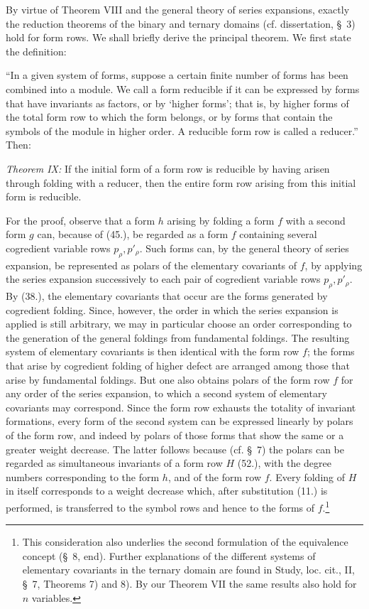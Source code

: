 \documentclass[11pt]{article}
\begin{document}
By virtue of Theorem VIII and the general theory of series expansions, exactly the reduction theorems of the binary and ternary domains (cf. dissertation, \S\ 3) hold for form rows. We shall briefly derive the principal theorem. We first state the definition:

``In a given system of forms, suppose a certain finite number of forms has been combined into a module. We call a form reducible if it can be expressed by forms that have invariants as factors, or by `higher forms'; that is, by higher forms of the total form row to which the form belongs, or by forms that contain the symbols of the module in higher order. A reducible form row is called a reducer.'' Then:

\emph{Theorem IX:} If the initial form of a form row is reducible by having arisen through folding with a reducer, then the entire form row arising from this initial form is reducible.

For the proof, observe that a form $h$ arising by folding a form $f$ with a second form $g$ can, because of (45.), be regarded as a form $f$ containing several cogredient variable rows $p_\rho,p'_\rho$. Such forms can, by the general theory of series expansion, be represented as polars of the elementary covariants of $f$, by applying the series expansion successively to each pair of cogredient variable rows $p_\rho,p'_\rho$. By (38.), the elementary covariants that occur are the forms generated by cogredient folding. Since, however, the order in which the series expansion is applied is still arbitrary, we may in particular choose an order corresponding to the generation of the general foldings from fundamental foldings. The resulting system of elementary covariants is then identical with the form row $f$; the forms that arise by cogredient folding of higher defect are arranged among those that arise by fundamental foldings. But one also obtains polars of the form row $f$ for any order of the series expansion, to which a second system of elementary covariants may correspond. Since the form row exhausts the totality of invariant formations, every form of the second system can be expressed linearly by polars of the form row, and indeed by polars of those forms that show the same or a greater weight decrease. The latter follows because (cf. \S\ 7) the polars can be regarded as simultaneous invariants of a form row $H$ (52.), with the degree numbers corresponding to the form $h$, and of the form row $f$. Every folding of $H$ in itself corresponds to a weight decrease which, after substitution (11.) is performed, is transferred to the symbol rows and hence to the forms of $f$.\footnote{This consideration also underlies the second formulation of the equivalence concept (\S\ 8, end). Further explanations of the different systems of elementary covariants in the ternary domain are found in Study, loc. cit., II, \S\ 7, Theorems 7) and 8). By our Theorem VII the same results also hold for $n$ variables.}
\end{document}
